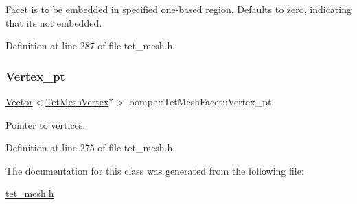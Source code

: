 Facet is to be embedded in specified one-\/based region. Defaults to zero, indicating that its not embedded. 



Definition at line 287 of file tet\+\_\+mesh.\+h.

\mbox{\label{classoomph_1_1TetMeshFacet_a04408ee7d013283e6ca4c109da15d5e2}} 
\subsubsection{\texorpdfstring{Vertex\+\_\+pt}{Vertex\_pt}}
{\footnotesize\ttfamily \hyperlink{classoomph_1_1Vector}{Vector}$<$\hyperlink{classoomph_1_1TetMeshVertex}{Tet\+Mesh\+Vertex}$\ast$$>$ oomph\+::\+Tet\+Mesh\+Facet\+::\+Vertex\+\_\+pt\hspace{0.3cm}{\ttfamily [private]}}



Pointer to vertices. 



Definition at line 275 of file tet\+\_\+mesh.\+h.



The documentation for this class was generated from the following file\+:\begin{DoxyCompactItemize}
\item 
\hyperlink{tet__mesh_8h}{tet\+\_\+mesh.\+h}\end{DoxyCompactItemize}
